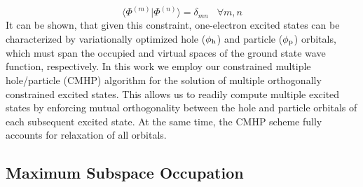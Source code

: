 \documentclass{article}
\begin{document}
\begin{equation}
\label{eq:OCcondition}
\langle \Phi^{(m)} | \Phi^{(n)} \rangle = \delta_{mn} \;\;\;  \forall m,n
\end{equation}
 It can be shown, that given this constraint, one-electron excited states can be characterized by variationally optimized hole ($\phi_{\rm h}$) and particle ($\phi_{\rm p}$) orbitals, which must span the occupied and virtual spaces of the ground state wave function, respectively.
In this work we employ our constrained multiple hole/particle (CMHP) algorithm for the solution of multiple orthogonally constrained excited states.\cite{derricotte_simulation_2015} This allows us to readily compute multiple excited states by enforcing mutual orthogonality between the hole and particle orbitals of each subsequent excited state. At the same time, the CMHP scheme fully accounts for relaxation of all orbitals. 
\subsection*{Maximum Subspace Occupation}

\end{document}

